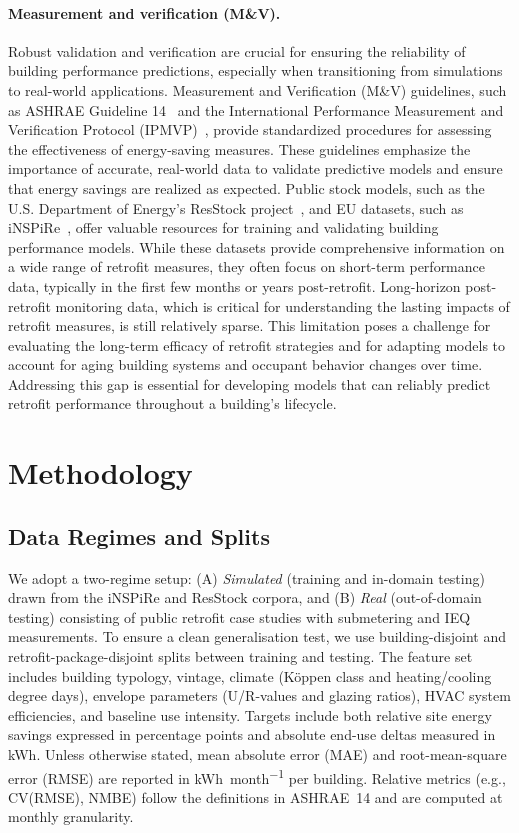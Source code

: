 ﻿\documentclass{article}
\begin{document}
\paragraph{Measurement and verification (M\&V).} Robust validation and verification are crucial for ensuring the reliability of building performance predictions, especially when transitioning from simulations to real-world applications. Measurement and Verification (M\&V) guidelines, such as ASHRAE Guideline 14~\citep{ashrae2014guideline} and the International Performance Measurement and Verification Protocol (IPMVP)~\citep{ipmvp2012}, provide standardized procedures for assessing the effectiveness of energy-saving measures. These guidelines emphasize the importance of accurate, real-world data to validate predictive models and ensure that energy savings are realized as expected. Public stock models, such as the U.S. Department of Energy’s ResStock project~\citep{resstock2017}, and EU datasets, such as iNSPiRe~\citep{wolf2014inspire}, offer valuable resources for training and validating building performance models. While these datasets provide comprehensive information on a wide range of retrofit measures, they often focus on short-term performance data, typically in the first few months or years post-retrofit. Long-horizon post-retrofit monitoring data, which is critical for understanding the lasting impacts of retrofit measures, is still relatively sparse. This limitation poses a challenge for evaluating the long-term efficacy of retrofit strategies and for adapting models to account for aging building systems and occupant behavior changes over time. Addressing this gap is essential for developing models that can reliably predict retrofit performance throughout a building’s lifecycle.
\section{Methodology}
\subsection{Data Regimes and Splits}
We adopt a two-regime setup: (A) \emph{Simulated} (training and in-domain testing) drawn from the iNSPiRe and ResStock corpora, and (B) \emph{Real} (out-of-domain testing) consisting of public retrofit case studies with submetering and IEQ measurements.
To ensure a clean generalisation test, we use building-disjoint and retrofit-package-disjoint splits between training and testing.
The feature set includes building typology, vintage, climate (K\"oppen class and heating/cooling degree days), envelope parameters (U/R-values and glazing ratios), HVAC system efficiencies, and baseline use intensity. Targets include both relative site energy savings expressed in percentage points and absolute end-use deltas measured in \si{kWh}. Unless otherwise stated, mean absolute error (MAE) and root-mean-square error (RMSE) are reported in \si{kWh\per month} per building. Relative metrics (e.g., CV(RMSE), NMBE) follow the definitions in ASHRAE~14 and are computed at monthly granularity.
\end{document}
